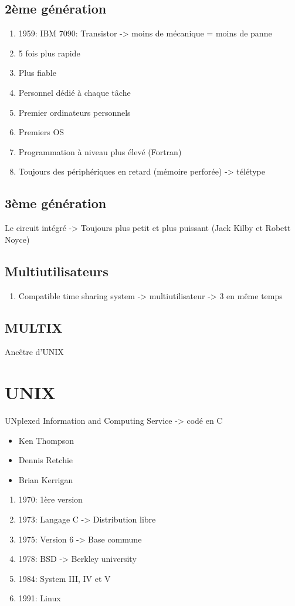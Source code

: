 \subsection{2ème génération}
\begin{enumerate}
  \item 1959: IBM 7090: Transistor -> moins de mécanique = moins de panne
  \item 5 fois plus rapide
  \item Plus fiable
  \item Personnel dédié à chaque tâche
  \item Premier ordinateurs personnels
  \item Premiers OS
  \item Programmation à niveau plus élevé (Fortran)
  \item Toujours des périphériques en retard (mémoire perforée) -> télétype
\end{enumerate}

\subsection{3ème génération}
Le circuit intégré -> Toujours plus petit et plus puissant (Jack Kilby et Robett Noyce)

\subsection{Multiutilisateurs}
\begin{enumerate}
\item Compatible time sharing system -> multiutilisateur -> 3 en même temps
\end{enumerate}

\subsection{MULTIX}
Ancêtre d'UNIX

\section{UNIX}
UNplexed Information and Computing Service -> codé en C 
\begin{itemize}
\item Ken Thompson
\item Dennis Retchie
\item Brian Kerrigan
\end{itemize}
\begin{enumerate}
  \item 1970: 1ère version
  \item 1973: Langage C -> Distribution libre
  \item 1975: Version 6 -> Base commune
  \item 1978: BSD -> Berkley university
  \item 1984: System III, IV et V
  \item 1991: Linux
\end{enumerate}

